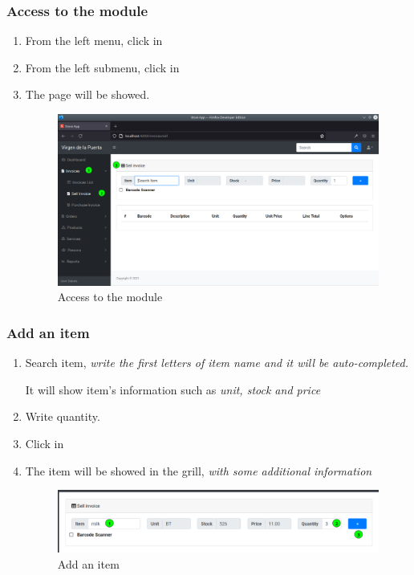 \documentclass[a4paper,11pt]{refart}
\begin{document}
\subsubsection{Access to the module}
\begin{enumerate}
	\item From the left menu, click in  
	\item From the left submenu, click in  
	\item The page will be showed.
	\begin{figure}[H]\centering
		\includegraphics[width=\textwidth]{images/sellinvoice-1}
		\caption{Access to the module}\label{fig:sellinvoice-1}
	\end{figure}
\end{enumerate}

\subsubsection{Add an item}
\begin{enumerate}
	\item Search item, \emph{write the first letters of item name and it will be auto-completed.}
	
	\medskip
	\begin{leftbar}
		It will show item's information such as \emph{ unit, stock and price}
	\end{leftbar}
	\item Write quantity.
	\item Click in \keys{\texttt{+}}
	\item The item will be showed in the grill,  \emph{with some additional information}
	\begin{figure}[H]\centering
		\includegraphics[width=\textwidth]{images/sellinvoice-2}
		\caption{Add an item}\label{fig:sellinvoice-2}
	\end{figure}
\end{enumerate}
\end{document}
